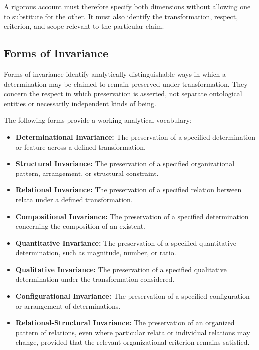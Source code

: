 A rigorous account must therefore specify both dimensions
without allowing one to substitute for the other. It must
also identify the transformation, respect, criterion, and
scope relevant to the particular claim.

\subsection{Forms of Invariance}

Forms of invariance identify analytically distinguishable
ways in which a determination may be claimed to remain
preserved under transformation. They concern the respect
in which preservation is asserted, not separate ontological
entities or necessarily independent kinds of being.

The following forms provide a working analytical vocabulary:

\begin{itemize}
    \item \textbf{Determinational Invariance:}
          The preservation of a specified determination
          or feature across a defined transformation.

    \item \textbf{Structural Invariance:}
          The preservation of a specified organizational
          pattern, arrangement, or structural constraint.

    \item \textbf{Relational Invariance:}
          The preservation of a specified relation between
          relata under a defined transformation.

    \item \textbf{Compositional Invariance:}
          The preservation of a specified determination
          concerning the composition of an existent.

    \item \textbf{Quantitative Invariance:}
          The preservation of a specified quantitative
          determination, such as magnitude, number, or ratio.

    \item \textbf{Qualitative Invariance:}
          The preservation of a specified qualitative
          determination under the transformation considered.

    \item \textbf{Configurational Invariance:}
          The preservation of a specified configuration
          or arrangement of determinations.

    \item \textbf{Relational-Structural Invariance:}
          The preservation of an organized pattern of
          relations, even where particular relata or
          individual relations may change, provided that
          the relevant organizational criterion remains
          satisfied.
\end{itemize}

